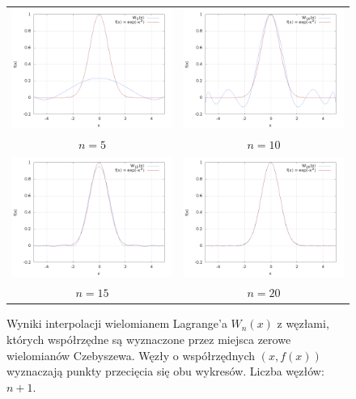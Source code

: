 \begin{figure}[h!]
	\begin{tabular}{cc}
		\includegraphics[width=75mm]{czeb_n5.png} &   \includegraphics[width=75mm]{czeb_n10.png} \\
	$ n = 5 $ & $ n = 10 $ \\[6pt]
		\includegraphics[width=75mm]{czeb_n15.png} &   \includegraphics[width=75mm]{czeb_n20.png} \\
		$ n = 15 $ & $ n = 20 $ \\[6pt]
	\end{tabular}
	\caption{Wyniki interpolacji wielomianem Lagrange’a $ W_n(x) $ z węzłami, których współrzędne są wyznaczone przez miejsca zerowe wielomianów Czebyszewa. Węzły o współrzędnych $ (x, f(x)) $ wyznaczają punkty przecięcia się obu wykresów. Liczba węzłów: $ n + 1 $.}
	\label{czebyszew}
\end{figure}
	
